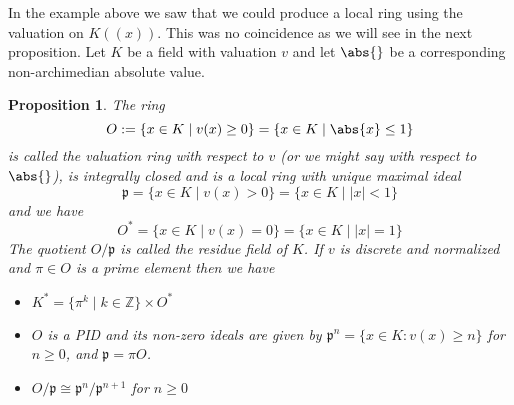 \documentclass{article}
\newtheorem{proposition}{Proposition}[section]
\newcommand{\mfrak}[1]{\mathfrak{#1}}
\newcommand{\mbb}[1]{\mathbb{#1}}
\numberwithin{equation}{section}
\begin{document}
In the example above we saw that we could produce a local ring using the valuation on $K((x))$. This was no coincidence as we will see in the next proposition. Let $K$ be a field with valuation $v$ and let $\abs{}$ be a corresponding non-archimedian absolute value.

\begin{proposition}\label{prop: Valuation ring of a field}
	The ring
	$$O := \{x \in K \mid  v(x) \geq 0 \} = \{x \in K \mid  \abs{x} \leq 1 \}$$
	is called the valuation ring with respect to $v$ (or we might say with respect to $\abs{}$), is integrally closed and is a local ring with unique maximal ideal
	$$\mfrak p = \{x \in K \mid v(x) > 0 \} = \{x \in K \mid |x| < 1 \}$$
	and we have
	$$O^* = \{x \in K \mid v(x) = 0 \} = \{x \in K \mid |x| = 1 \}$$
	The quotient $O / \mfrak p$ is called the residue field of $K$. If $v$ is discrete and normalized and $\pi \in O$ is a prime element then we have
	\begin{itemize}
    	\item $K^* = \{\pi^k \mid k \in \mbb Z \} \times O^*$
    	\item $O$ is a PID and its non-zero ideals are given by
          	$\mfrak p^n = \{x \in K : v(x) \geq n \}$
          	for $n \geq 0$, and $\mfrak p = \pi O$.
    	\item $O / \mfrak p \cong \mfrak p^n / \mfrak p^{n+1}$ for $n \geq 0$
	\end{itemize}
\end{proposition}
\end{document}

